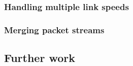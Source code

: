 				
				\subsubsection{Handling multiple link speeds}
					
				
				\subsubsection{Merging packet streams}
					
			
			\subsection{Further work}
				
	
